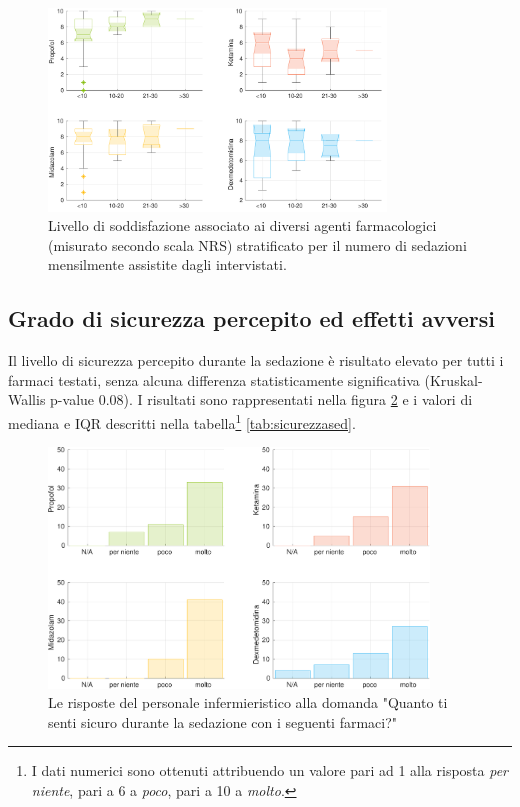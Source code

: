 \begin{figure}[!h]
    \centering
    \includegraphics[width=0.8\textwidth]{Figure/qualita-strat-frequenza.pdf}
    \caption{Livello di soddisfazione associato ai diversi agenti farmacologici (misurato secondo scala NRS) stratificato per il numero di sedazioni mensilmente assistite dagli intervistati.}
    \label{fig:qualitafrequenza}
\end{figure}

\newpage

\subsection*{Grado di sicurezza percepito ed effetti avversi}

Il livello di sicurezza percepito durante la sedazione è risultato elevato per tutti i farmaci testati, senza alcuna differenza statisticamente significativa (Kruskal-Wallis p-value 0.08). I risultati sono rappresentati nella figura \ref{fig:sicurezza} e i valori di mediana e IQR descritti nella tabella\footnote{I dati numerici sono ottenuti attribuendo un valore pari ad 1 alla risposta \emph{per niente}, pari a 6 a \emph{poco}, pari a 10 a \emph{molto}.} \ref{tab:sicurezzased}.

\begin{figure}[!h]
    \centering
    \includegraphics[width=0.9\textwidth]{Figure/sicurezza.pdf}
    \caption{Le risposte del personale infermieristico alla domanda "Quanto ti senti sicuro durante la sedazione con i seguenti farmaci?"}
    \label{fig:sicurezza}
\end{figure}

